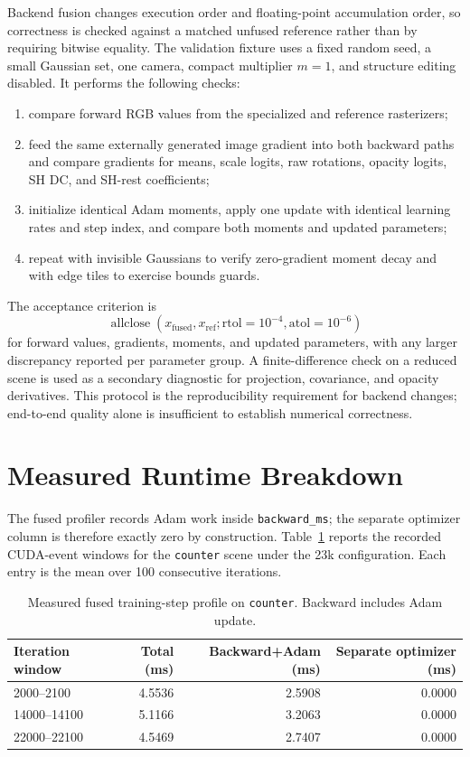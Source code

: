 Backend fusion changes execution order and floating-point accumulation order, so correctness is checked against a matched unfused reference rather than by requiring bitwise equality. The validation fixture uses a fixed random seed, a small Gaussian set, one camera, compact multiplier $m=1$, and structure editing disabled. It performs the following checks:
\begin{enumerate}
  \item compare forward RGB values from the specialized and reference rasterizers;
  \item feed the same externally generated image gradient into both backward paths and compare gradients for means, scale logits, raw rotations, opacity logits, SH DC, and SH-rest coefficients;
  \item initialize identical Adam moments, apply one update with identical learning rates and step index, and compare both moments and updated parameters;
  \item repeat with invisible Gaussians to verify zero-gradient moment decay and with edge tiles to exercise bounds guards.
\end{enumerate}
The acceptance criterion is
\begin{equation}
\operatorname{allclose}(x_{\mathrm{fused}},x_{\mathrm{ref}};
\mathrm{rtol}=10^{-4},\mathrm{atol}=10^{-6})
\end{equation}
for forward values, gradients, moments, and updated parameters, with any larger discrepancy reported per parameter group. A finite-difference check on a reduced scene is used as a secondary diagnostic for projection, covariance, and opacity derivatives. This protocol is the reproducibility requirement for backend changes; end-to-end quality alone is insufficient to establish numerical correctness.

\section{Measured Runtime Breakdown}

The fused profiler records Adam work inside \texttt{backward\_ms}; the separate optimizer column is therefore exactly zero by construction. Table~\ref{tab:fused-profile} reports the recorded CUDA-event windows for the \texttt{counter} scene under the 23k configuration. Each entry is the mean over 100 consecutive iterations.

\begin{table}[H]
\centering
\caption{Measured fused training-step profile on \texttt{counter}. Backward includes Adam update.}
\label{tab:fused-profile}
\begin{tabular}{lrrr}
\toprule
Iteration window & Total (ms) & Backward+Adam (ms) & Separate optimizer (ms) \\
\midrule
2000--2100 & 4.5536 & 2.5908 & 0.0000 \\
14000--14100 & 5.1166 & 3.2063 & 0.0000 \\
22000--22100 & 4.5469 & 2.7407 & 0.0000 \\
\bottomrule
\end{tabular}
\end{table}

